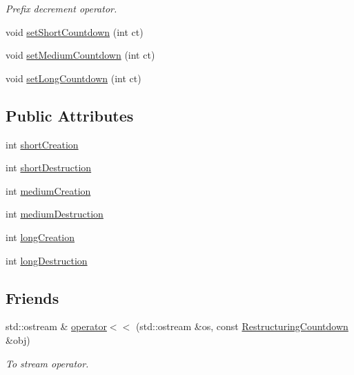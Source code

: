 \begin{DoxyCompactItemize}
\begin{DoxyCompactList}\small\item\em \-Prefix decrement operator. \end{DoxyCompactList}\item 
void \hyperlink{structcryomesh_1_1manipulators_1_1IClusterAnalyser_1_1RestructuringCountdown_a16766b635831bbff21aaae1417cd8c2b}{set\-Short\-Countdown} (int ct)
\item 
void \hyperlink{structcryomesh_1_1manipulators_1_1IClusterAnalyser_1_1RestructuringCountdown_ab8c08d4d9dd8fd3a7ad535a7bdf3c74a}{set\-Medium\-Countdown} (int ct)
\item 
void \hyperlink{structcryomesh_1_1manipulators_1_1IClusterAnalyser_1_1RestructuringCountdown_aca25ee4c4f6a08391ab3f5fa60ea8a54}{set\-Long\-Countdown} (int ct)
\end{DoxyCompactItemize}
\subsection*{\-Public \-Attributes}
\begin{DoxyCompactItemize}
\item 
int \hyperlink{structcryomesh_1_1manipulators_1_1IClusterAnalyser_1_1RestructuringCountdown_a4e0fb0eb08819e98beb74f9ceda06964}{short\-Creation}
\item 
int \hyperlink{structcryomesh_1_1manipulators_1_1IClusterAnalyser_1_1RestructuringCountdown_aa4c23b58d7bdbdc1e6ffa1161cfa0da2}{short\-Destruction}
\item 
int \hyperlink{structcryomesh_1_1manipulators_1_1IClusterAnalyser_1_1RestructuringCountdown_ad67471fc6daa6384e77d4e6681decce5}{medium\-Creation}
\item 
int \hyperlink{structcryomesh_1_1manipulators_1_1IClusterAnalyser_1_1RestructuringCountdown_ae6adfde336b7d67ad433991af81652b4}{medium\-Destruction}
\item 
int \hyperlink{structcryomesh_1_1manipulators_1_1IClusterAnalyser_1_1RestructuringCountdown_ac248eef511236bbb0c9d5e6b454a97a3}{long\-Creation}
\item 
int \hyperlink{structcryomesh_1_1manipulators_1_1IClusterAnalyser_1_1RestructuringCountdown_a147c9ec6f5896ca4e8151e01eb764d0e}{long\-Destruction}
\end{DoxyCompactItemize}
\subsection*{\-Friends}
\begin{DoxyCompactItemize}
\item 
std\-::ostream \& \hyperlink{structcryomesh_1_1manipulators_1_1IClusterAnalyser_1_1RestructuringCountdown_afd20f7f5eb07d5e2bb273737fe91adfd}{operator$<$$<$} (std\-::ostream \&os, const \hyperlink{structcryomesh_1_1manipulators_1_1IClusterAnalyser_1_1RestructuringCountdown}{\-Restructuring\-Countdown} \&obj)
\begin{DoxyCompactList}\small\item\em \-To stream operator. \end{DoxyCompactList}\end{DoxyCompactItemize}


